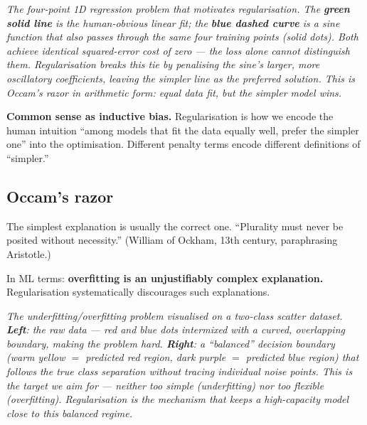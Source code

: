 \documentclass[11pt, a4paper]{article}
\begin{document}
\begin{center}

\footnotesize\textit{The four-point 1D regression problem that motivates regularisation. The \textbf{green solid line} is the human-obvious linear fit; the \textbf{blue dashed curve} is a sine function that also passes through the same four training points (solid dots). Both achieve \emph{identical} squared-error cost of zero --- the loss alone cannot distinguish them. Regularisation breaks this tie by penalising the sine's larger, more oscillatory coefficients, leaving the simpler line as the preferred solution. This is Occam's razor in arithmetic form: equal data fit, but the simpler model wins.}
\end{center}

\textbf{Common sense as inductive bias.} Regularisation is how we encode the human intuition ``among models that fit the data equally well, prefer the simpler one'' into the optimisation. Different penalty terms encode different definitions of ``simpler.''

\subsection{Occam's razor}

\begin{defbox}
The simplest explanation is usually the correct one. ``Plurality must never be posited without necessity.'' (William of Ockham, 13th century, paraphrasing Aristotle.)
\end{defbox}

In ML terms: \textbf{overfitting is an unjustifiably complex explanation.} Regularisation systematically discourages such explanations.

\begin{center}

\footnotesize\textit{The underfitting/overfitting problem visualised on a two-class scatter dataset. \textbf{Left}: the raw data --- red and blue dots intermixed with a curved, overlapping boundary, making the problem hard. \textbf{Right}: a ``balanced'' decision boundary (warm yellow $=$ predicted red region, dark purple $=$ predicted blue region) that follows the true class separation without tracing individual noise points. This is the target we aim for --- neither too simple (underfitting) nor too flexible (overfitting). Regularisation is the mechanism that keeps a high-capacity model close to this balanced regime.}
\end{center}
\end{document}
